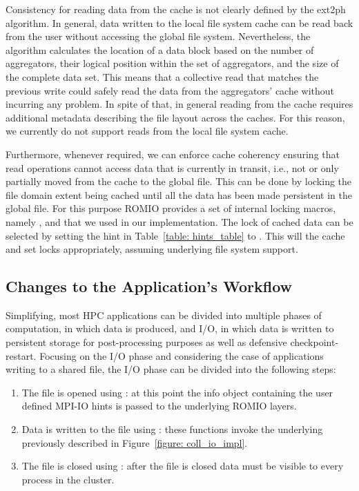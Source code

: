 Consistency for reading data from the cache is not clearly defined by the ext2ph algorithm. In general, data written to the local file system cache can be read back from the user without accessing the global file system. Nevertheless, the algorithm 
calculates the location of a data block based on the number of aggregators, their logical position within the set of aggregators, and the size of the complete data set. This means that a collective read that matches the previous write could safely 
read the data from the aggregators' cache without incurring any problem. In spite of that, in general reading from the cache requires additional metadata describing the file layout across the caches. For this reason, we currently do not support reads 
from the local file system cache.

Furthermore, whenever required, we can enforce cache coherency ensuring that read operations cannot access data that is currently in transit, i.e., not or only partially moved from the cache to the global file. This can be done by locking the file domain 
extent being cached until all the data has been made persistent in the global file. For this purpose ROMIO provides a set of internal locking macros, namely ,  and  that we 
used in our implementation. The lock of cached data can be selected by setting the  hint in Table~\ref{table: hints_table} to . This will  the cache and set locks appropriately, assuming underlying 
file system support.

\subsection{Changes to the Application's Workflow}
\label{subsec: new-workflow}
Simplifying, most HPC applications can be divided into multiple phases of computation, in which data is produced, and I/O, in which data is written to persistent storage for post-processing purposes as well as defensive checkpoint-restart. Focusing on the 
I/O phase and considering the case of applications writing to a shared file, the I/O phase can be divided into the following steps:

\begin{enumerate}
        \item The file is opened using : at this point the info object containing the user defined MPI-IO hints is passed to the underlying ROMIO layers.
        \item Data is written to the file using : these functions invoke the underlying  previously described in Figure~\ref{figure: coll_io_impl}.
        \item The file is closed using : after the file is closed data must be visible to every process in the cluster. 
\end{enumerate}

